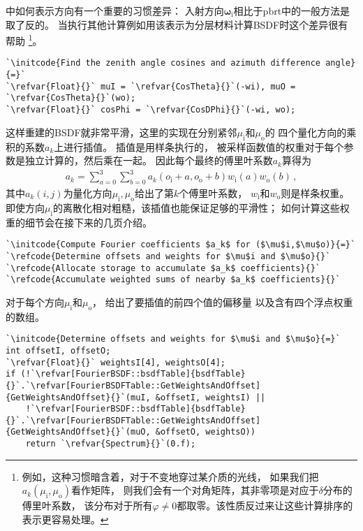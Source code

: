 中如何表示方向有一个重要的习惯差异：
入射方向${\bm\omega}_{\mathrm{i}}$相比于pbrt中的一般方法是取了反的。
当执行其他计算例如用该表示为分层材料计算BSDF时这个差异很有帮助
\footnote{例如，这种习惯暗含着，对于不变地穿过某介质的光线，
如果我们把$a_k(\mu_{\mathrm{i}},\mu_{\mathrm{o}})$看作矩阵，
则我们会有一个对角矩阵，其非零项是对应于$\delta$分布的傅里叶系数，
该分布对于所有$\varphi\ne0$都取零。该性质反过来让这些计算排序的表示更容易处理。}。
\begin{lstlisting}
`\initcode{Find the zenith angle cosines and azimuth difference angle}{=}`
`\refvar{Float}{}` muI = `\refvar{CosTheta}{}`(-wi), muO = `\refvar{CosTheta}{}`(wo);
`\refvar{Float}{}` cosPhi = `\refvar{CosDPhi}{}`(-wi, wo);
\end{lstlisting}
这样重建的BSDF就非常平滑，这里的实现在分别紧邻$\mu_{\mathrm{i}}$和$\mu_{\mathrm{o}}$的
四个量化方向的乘积的系数$a_k$上进行插值。
插值是用样条执行的，
被采样函数值的权重对于每个参数是独立计算的，然后乘在一起。
因此每个最终的傅里叶系数$a_k$算得为
\begin{align}\label{eq:8.22}
    a_k=\sum\limits_{a=0}^{3}\sum\limits_{b=0}^{3}a_k(o_{\mathrm{i}}+a,o_{\mathrm{o}}+b)w_{\mathrm{i}}(a)w_{\mathrm{o}}(b)\, ,
\end{align}
其中$a_k(i,j)$为量化方向$\mu_{\mathrm{i}},\mu_{\mathrm{o}}$给出了第$k$个傅里叶系数，
$w_{\mathrm{i}}$和$w_{\mathrm{o}}$则是样条权重。
即使方向$\mu_{\mathrm{i}}$的离散化相对粗糙，该插值也能保证足够的平滑性；
如何计算这些权重的细节会在接下来的几页介绍。
\begin{lstlisting}
`\initcode{Compute Fourier coefficients $a_k$ for ($\mu$i,$\mu$o)}{=}`
`\refcode{Determine offsets and weights for $\mu$i and $\mu$o}{}`
`\refcode{Allocate storage to accumulate $a_k$ coefficients}{}`
`\refcode{Accumulate weighted sums of nearby $a_k$ coefficients}{}`
\end{lstlisting}

对于每个方向$\mu_{\mathrm{i}}$和$\mu_{\mathrm{o}}$，
给出了要插值的前四个值的偏移量
以及含有四个浮点权重的数组。
\begin{lstlisting}
`\initcode{Determine offsets and weights for $\mu$i and $\mu$o}{=}`
int offsetI, offsetO;
`\refvar{Float}{}` weightsI[4], weightsO[4];
if (!`\refvar[FourierBSDF::bsdfTable]{bsdfTable}{}`.`\refvar[FourierBSDFTable::GetWeightsAndOffset]{GetWeightsAndOffset}{}`(muI, &offsetI, weightsI) ||
    !`\refvar[FourierBSDF::bsdfTable]{bsdfTable}{}`.`\refvar[FourierBSDFTable::GetWeightsAndOffset]{GetWeightsAndOffset}{}`(muO, &offsetO, weightsO))
    return `\refvar{Spectrum}{}`(0.f);
\end{lstlisting}


